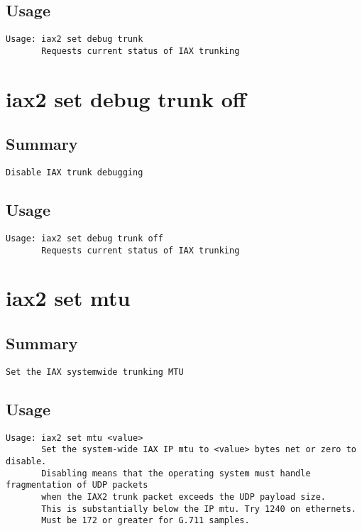 \subsection{Usage}
\begin{verbatim}
Usage: iax2 set debug trunk
       Requests current status of IAX trunking

\end{verbatim}


\section{iax2 set debug trunk off}
\subsection{Summary}
\begin{verbatim}
Disable IAX trunk debugging
\end{verbatim}
\subsection{Usage}
\begin{verbatim}
Usage: iax2 set debug trunk off
       Requests current status of IAX trunking

\end{verbatim}


\section{iax2 set mtu}
\subsection{Summary}
\begin{verbatim}
Set the IAX systemwide trunking MTU
\end{verbatim}
\subsection{Usage}
\begin{verbatim}
Usage: iax2 set mtu <value>
       Set the system-wide IAX IP mtu to <value> bytes net or zero to disable.
       Disabling means that the operating system must handle fragmentation of UDP packets
       when the IAX2 trunk packet exceeds the UDP payload size.
       This is substantially below the IP mtu. Try 1240 on ethernets.
       Must be 172 or greater for G.711 samples.

\end{verbatim}


